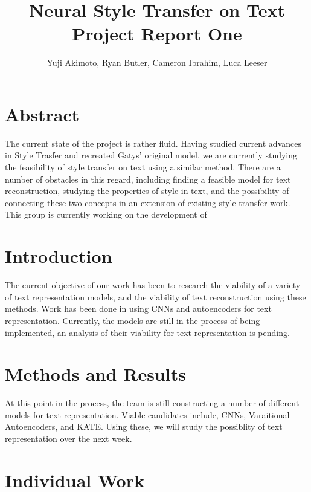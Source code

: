 \documentclass{article}
\title{Neural Style Transfer on Text\\Project Report One}
\author{Yuji Akimoto, Ryan Butler, Cameron Ibrahim, Luca Leeser}
\begin{document}
\maketitle

\section*{Abstract}

The current state of the project is rather fluid. Having studied current advances
in Style Trasfer and recreated Gatys' original model, we are currently studying
the feasibility of style transfer on text using a similar method. There are a number
of obstacles in this regard, including finding a feasible model for text reconstruction,
studying the properties of style in text, and the possibility of connecting these
two concepts in an extension of existing style transfer work. This group is currently
working on the development of 

\section{Introduction}

The current objective of our work has been to research the viability of a variety of text representation models, and the viability of text reconstruction using these methods. Work has been done in using CNNs and autoencoders for text representation. Currently,
the models are still in the process of being implemented, an analysis of their viability for text representation is pending.


\section{Methods and Results}

At this point in the process, the team is still constructing a number of different models
for text representation. Viable candidates include, CNNs, Varaitional Autoencoders, and KATE. Using these, we will study the possiblity of text representation over the next week.

\section{Individual Work}
\end{document}
